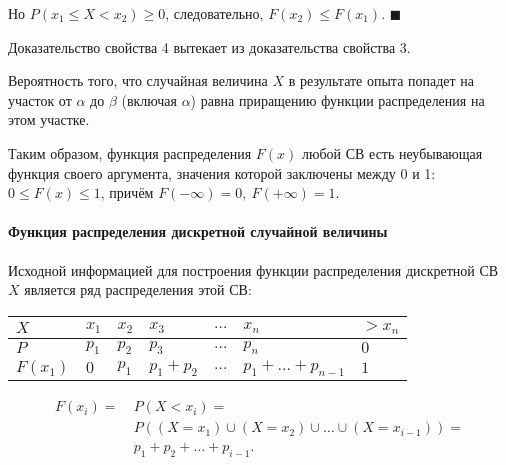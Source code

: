 \documentclass[a4paper]{article}
\renewcommand{\qedsymbol}{\ensuremath{\blacksquare}}
\newcommand{\qedd}{\hfill{\color{Dark}\qedsymbol}}
\newcommand{\sleq}{\leqslant}
\newcommand{\sgeq}{\geqslant}
\begin{document}
                    Но $P(x_1 \sleq X < x_2) \sgeq 0$, следовательно, $F(x_2) \sleq F(x_1)$. \qedd

                    Доказательство свойства 4 вытекает из доказательства свойства 3.

                    Вероятность того, что случайная величина $X$ в результате опыта попадет на участок от $\alpha$ до $\beta$ (включая $\alpha$) равна приращению функции распределения на этом участке.
                    
                    Таким образом, функция распределения $F(x)$ любой СВ есть неубывающая функция своего аргумента, значения которой заключены между 0 и 1: \newline
                    $0 \sleq F(x) \sleq 1$, причём $F(-\infty) = 0 , \: F(+\infty) = 1$.

                \paragraph{Функция распределения дискретной случайной величины}

                    Исходной информацией для построения функции распределения дискретной СВ $X$ является ряд распределения этой СВ:

                    \begin{tabular}{*{5}{|C{1.6cm}}|C{2.8cm}|C{1.8cm}|}
                        \hline
                        $X$ & $x_1$ & $x_2$ & $x_3$ & $\ldots$ & $x_n$ & $> x_n$ \\
                        \hline
                        $P$ & $p_1$ & $p_2$ & $p_3$ & $\ldots$ & $p_n$ & $0$ \\
                        \hline
                        $F(x_1)$ & $0$ & $p_1$ & $p_1 + p_2$ & $\ldots$ &
                            $p_1 + \ldots + p_{n - 1}$ & $1$ \\
                        \hline
                    \end{tabular}
                    \begin{equation*}
                        \begin{aligned}
                            F(x_i) = ~& P(X < x_i) = \\[1.0ex]
                            & P \left( (X = x_1) \cup (X = x_2) \cup \ldots \cup
                                (X = x_{i - 1}) \right) = \\[1.0ex]
                            & p_1 + p_2 + \ldots + p_{i - 1} .
                        \end{aligned}
                    \end{equation*}
\end{document}
